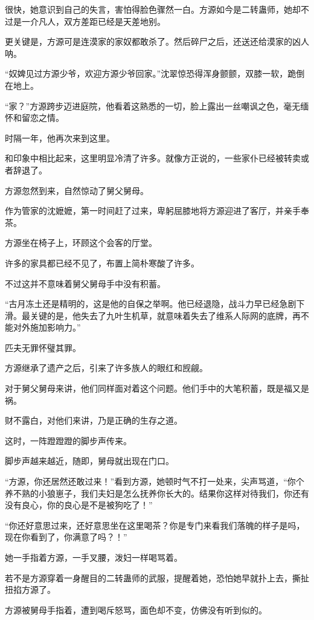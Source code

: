 \begin{this_body}
很快，她意识到自己的失言，害怕得脸色骤然一白。方源如今是二转蛊师，她却不过是一介凡人，双方差距已经是天差地别。

更关键是，方源可是连漠家的家奴都敢杀了。然后碎尸之后，还送还给漠家的凶人呐。

“奴婢见过方源少爷，欢迎方源少爷回家。”沈翠惊恐得浑身颤颤，双膝一软，跪倒在地上。

“家？”方源跨步迈进庭院，他看着这熟悉的一切，脸上露出一丝嘲讽之色，毫无缅怀和留恋之情。

时隔一年，他再次来到这里。

和印象中相比起来，这里明显冷清了许多。就像方正说的，一些家仆已经被转卖或者辞退了。

方源忽然到来，自然惊动了舅父舅母。

作为管家的沈嬷嬷，第一时间赶了过来，卑躬屈膝地将方源迎进了客厅，并亲手奉茶。

方源坐在椅子上，环顾这个会客的厅堂。

许多的家具都已经不见了，布置上简朴寒酸了许多。

不过这并不意味着舅父舅母手中没有积蓄。

“古月冻土还是精明的，这是他的自保之举啊。他已经退隐，战斗力早已经急剧下滑。最关键的是，他失去了九叶生机草，就意味着失去了维系人际网的底牌，再不能对外施加影响力。”

匹夫无罪怀璧其罪。

方源继承了遗产之后，引来了许多族人的眼红和觊觎。

对于舅父舅母来讲，他们同样面对着这个问题。他们手中的大笔积蓄，既是福又是祸。

财不露白，对他们来讲，乃是正确的生存之道。

这时，一阵蹬蹬蹬的脚步声传来。

脚步声越来越近，随即，舅母就出现在门口。

“方源，你还居然还敢过来！”看到方源，她顿时气不打一处来，尖声骂道，“你个养不熟的小狼崽子，我们夫妇是怎么抚养你长大的。结果你这样对待我们，你还有没有良心，你的良心是不是被狗吃了！”

“你还好意思过来，还好意思坐在这里喝茶？你是专门来看我们落魄的样子是吗，现在你看到了，你满意了吗？！”

她一手指着方源，一手叉腰，泼妇一样喝骂着。

若不是方源穿着一身醒目的二转蛊师的武服，提醒着她，恐怕她早就扑上去，撕扯扭掐方源了。

方源被舅母手指着，遭到喝斥怒骂，面色却不变，仿佛没有听到似的。


\end{this_body}
